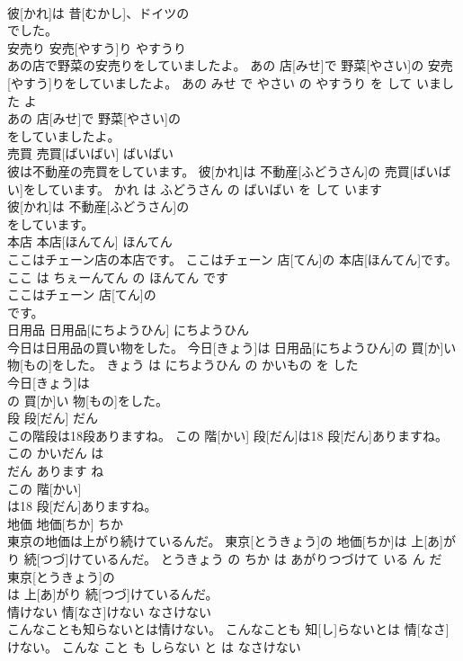 \documentclass[8pt]{extreport}
\begin{document}
\begin{CJK}{UTF8}{min}
\\	彼[かれ]は 昔[むかし]、ドイツの
\\	でした。			
\\	安売り	安売[やすう]り	やすうり	
\\	あの店で野菜の安売りをしていましたよ。	あの 店[みせ]で 野菜[やさい]の 安売[やすう]りをしていましたよ。	あの みせ で やさい の やすうり を して いました よ	
\\	あの 店[みせ]で 野菜[やさい]の
\\	をしていましたよ。			
\\	売買	売買[ばいばい]	ばいばい	
\\	彼は不動産の売買をしています。	彼[かれ]は 不動産[ふどうさん]の 売買[ばいばい]をしています。	かれ は ふどうさん の ばいばい を して います	
\\	彼[かれ]は 不動産[ふどうさん]の
\\	をしています。			
\\	本店	本店[ほんてん]	ほんてん	
\\	ここはチェーン店の本店です。	ここはチェーン 店[てん]の 本店[ほんてん]です。	ここ は ちぇーんてん の ほんてん です	
\\	ここはチェーン 店[てん]の
\\	です。			
\\	日用品	日用品[にちようひん]	にちようひん	
\\	今日は日用品の買い物をした。	今日[きょう]は 日用品[にちようひん]の 買[か]い 物[もの]をした。	きょう は にちようひん の かいもの を した	
\\	今日[きょう]は
\\	の 買[か]い 物[もの]をした。			
\\	段	段[だん]	だん	
\\	この階段は18段ありますね。	この 階[かい] 段[だん]は18 段[だん]ありますね。	この かいだん は 
\\	だん あります ね	
\\	この 階[かい]
\\	は18 段[だん]ありますね。			
\\	地価	地価[ちか]	ちか	
\\	東京の地価は上がり続けているんだ。	東京[とうきょう]の 地価[ちか]は 上[あ]がり 続[つづ]けているんだ。	とうきょう の ちか は あがりつづけて いる ん だ	
\\	東京[とうきょう]の
\\	は 上[あ]がり 続[つづ]けているんだ。			
\\	情けない	情[なさ]けない	なさけない	
\\	こんなことも知らないとは情けない。	こんなことも 知[し]らないとは 情[なさ]けない。	こんな こと も しらない と は なさけない	

\end{CJK}
\end{document}
